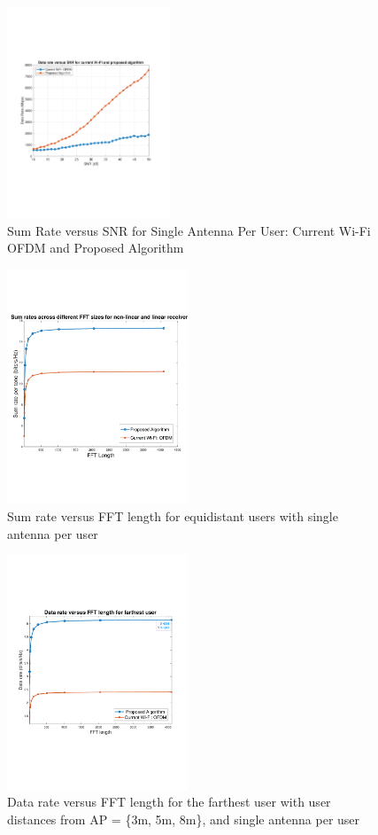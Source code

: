 \begin{figure}[t]
    \centering
    \includegraphics[trim = {30, 180, 10, 200}, clip, height = 6.3cm]{figures/data_rate_versus_SNR.pdf}
    \caption{Sum Rate versus SNR for Single Antenna Per User: Current Wi-Fi OFDM and Proposed Algorithm}
    \label{fig:data-rate-snr-single}
\end{figure}
\begin{figure}
    \centering
    \includegraphics[trim = {0, 150, 0, 130}, clip, height = 7cm]{figures/3UsersEqualDistance3mSumRatePerTone.pdf}
    \caption{Sum rate versus FFT length for equidistant users with single antenna per user}
    \label{fig:data-rate-fft-single}
\end{figure}
\begin{figure}
    \centering
    \includegraphics[trim = {20, 180, 0, 180}, clip, height = 7cm]{figures/3Users3_5_8mFarthestUserRatePerTone.pdf}
    \caption{Data rate versus FFT length for the farthest user with user distances from AP = \{3m, 5m, 8m\}, and single antenna per user}
    \label{fig:data-rate-farthest-fft-single}
\end{figure}

